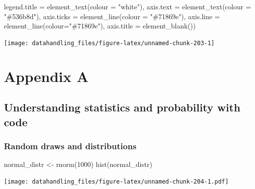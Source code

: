 \documentclass[
  12pt,
]{style/krantz}
\newenvironment{Shaded}{\begin{snugshade}}{\end{snugshade}}
\newcommand{\AttributeTok}[1]{\textcolor[rgb]{0.77,0.63,0.00}{#1}}
\newcommand{\DecValTok}[1]{\textcolor[rgb]{0.00,0.00,0.81}{#1}}
\newcommand{\FunctionTok}[1]{\textcolor[rgb]{0.00,0.00,0.00}{#1}}
\newcommand{\NormalTok}[1]{#1}
\newcommand{\OtherTok}[1]{\textcolor[rgb]{0.56,0.35,0.01}{#1}}
\newcommand{\StringTok}[1]{\textcolor[rgb]{0.31,0.60,0.02}{#1}}
\begin{document}
\begin{Shaded}
\begin{Highlighting}[]
        \AttributeTok{legend.title =} \FunctionTok{element\_text}\NormalTok{(}\AttributeTok{colour =} \StringTok{"white"}\NormalTok{),}
        \AttributeTok{axis.text =} \FunctionTok{element\_text}\NormalTok{(}\AttributeTok{colour =} \StringTok{"\#536b8d"}\NormalTok{),}
        \AttributeTok{axis.ticks =} \FunctionTok{element\_line}\NormalTok{(}\AttributeTok{colour =} \StringTok{"\#71869e"}\NormalTok{),}
        \AttributeTok{axis.line =} \FunctionTok{element\_line}\NormalTok{(}\AttributeTok{colour=}\StringTok{"\#71869e"}\NormalTok{),}
        \AttributeTok{axis.title =} \FunctionTok{element\_blank}\NormalTok{())}
\end{Highlighting}
\end{Shaded}

\texttt{[image: datahandling\_files/figure-latex/unnamed-chunk-203-1]}

\backmatter

\hypertarget{appendix-appendix}{%
\appendix {}}


\hypertarget{appendix-a}{%
\chapter{Appendix A}\label{appendix-a}}

\hypertarget{understanding-statistics-and-probability-with-code}{%
\section{Understanding statistics and probability with code}\label{understanding-statistics-and-probability-with-code}}

\hypertarget{random-draws-and-distributions}{%
\subsection{Random draws and distributions}\label{random-draws-and-distributions}}

\begin{Shaded}
\begin{Highlighting}[]
\NormalTok{normal\_distr }\OtherTok{\textless{}{-}} \FunctionTok{rnorm}\NormalTok{(}\DecValTok{1000}\NormalTok{)}
\FunctionTok{hist}\NormalTok{(normal\_distr)}
\end{Highlighting}
\end{Shaded}

\texttt{[image: datahandling\_files/figure-latex/unnamed-chunk-204-1.pdf]}
\end{document}
